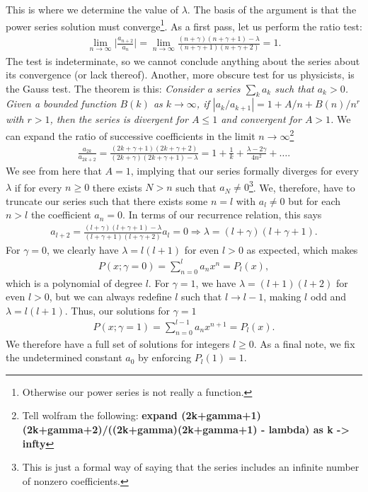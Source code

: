 This is where we determine the value of $\lambda$.
The basis of the argument is that the power series solution must converge\footnote{Otherwise our power series is not really a function.}.
As a first pass, let us perform the ratio test:
\begin{eqnarray}
    \lim_{n \rightarrow \infty} \Big| \frac{a_{n+2}}{a_{n}} \Big| = \lim_{n \rightarrow \infty} \frac{(n+\gamma)(n+\gamma+1) - \lambda}{(n+\gamma+1)(n+\gamma+2)} = 1
.\end{eqnarray}
The test is indeterminate, so we cannot conclude anything about the series about its convergence (or lack thereof).
Another, more obscure test for us physicists, is the Gauss test.
The theorem is this: \textit{Consider a series $\sum_{k} a_{k}$ such that $a_{k} > 0$. Given a bounded function $B(k)$ as $k \rightarrow \infty$, if $|a_{k}/a_{k+1}| = 1 + A/n + B(n)/n^{r}$ with $r > 1$, then the series is divergent for $A \leq 1$ and convergent for $A > 1$.}
We can expand the ratio of successive coefficients in the limit $n \rightarrow \infty$\footnote{Tell wolfram the following: \textbf{expand (2k+gamma+1)(2k+gamma+2)/((2k+gamma)(2k+gamma+1) - lambda) as k -> infty}}
\begin{eqnarray}
    \frac{a_{2k}}{a_{2k+2}} = \frac{(2k+\gamma+1)(2k+\gamma+2)}{(2k+\gamma)(2k+\gamma+1) - \lambda} = 1 + \frac{1}{k} + \frac{\lambda - 2\gamma}{4n^2} + \ldots
.\end{eqnarray}
We see from here that $A = 1$, implying that our series formally diverges for every $\lambda$ if for every $n \geq 0$ there exists $N > n$ such that $a_{N} \ne 0$\footnote{This is just a formal way of saying that the series includes an infinite number of nonzero coefficients.}.
We, therefore, have to truncate our series such that there exists some $n=l$ with $a_{l} \ne 0$ but for each $n > l$ the coefficient $a_{n} = 0$.
In terms of our recurrence relation, this says
\begin{eqnarray}
    a_{l+2} = \frac{(l+\gamma)(l+\gamma+1) - \lambda}{(l+\gamma+1)(l+\gamma+2)} a_{l} = 0 \Rightarrow \lambda = (l+\gamma)(l+\gamma+1)
.\end{eqnarray}
For $\gamma=0$, we clearly have $\lambda = l(l+1)$ for even $l > 0$ as expected, which makes
\begin{eqnarray}
    P(x;\gamma=0) = \sum_{n=0}^{l} a_{n} x^{n} = P_{l}(x)
,\end{eqnarray}
which is a polynomial of degree $l$.
For $\gamma = 1$, we have $\lambda = (l+1)(l+2)$ for even $l > 0$, but we can always redefine $l$ such that $l \rightarrow l - 1$, making $l$ odd and $\lambda = l(l+1)$.
Thus, our solutions for $\gamma = 1$
\begin{eqnarray}
    P(x;\gamma=1) = \sum_{n=0}^{l-1} a_{n} x^{n+1} = P_{l}(x)
.\end{eqnarray}
We therefore have a full set of solutions for integers $l \geq 0$.
As a final note, we fix the undetermined constant $a_0$ by enforcing $P_{l}(1) = 1$.



